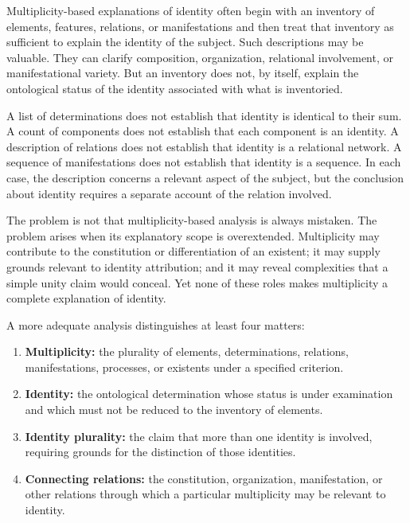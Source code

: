 Multiplicity-based explanations of identity
often begin with an inventory of elements,
features, relations, or manifestations and
then treat that inventory as sufficient to
explain the identity of the subject. Such
descriptions may be valuable. They can
clarify composition, organization, relational
involvement, or manifestational variety.
But an inventory does not, by itself, explain
the ontological status of the identity
associated with what is inventoried.

A list of determinations does not establish
that identity is identical to their sum.
A count of components does not establish
that each component is an identity.
A description of relations does not establish
that identity is a relational network.
A sequence of manifestations does not
establish that identity is a sequence.
In each case, the description concerns
a relevant aspect of the subject, but the
conclusion about identity requires a
separate account of the relation involved.

The problem is not that multiplicity-based
analysis is always mistaken. The problem
arises when its explanatory scope is
overextended. Multiplicity may contribute
to the constitution or differentiation of
an existent; it may supply grounds relevant
to identity attribution; and it may reveal
complexities that a simple unity claim
would conceal. Yet none of these roles
makes multiplicity a complete explanation
of identity.

A more adequate analysis distinguishes
at least four matters:

\begin{enumerate}
    \item \textbf{Multiplicity:} the plurality
    of elements, determinations, relations,
    manifestations, processes, or existents
    under a specified criterion.
    \item \textbf{Identity:} the ontological
    determination whose status is under
    examination and which must not be
    reduced to the inventory of elements.
    \item \textbf{Identity plurality:} the
    claim that more than one identity is
    involved, requiring grounds for the
    distinction of those identities.
    \item \textbf{Connecting relations:} the
    constitution, organization, manifestation,
    or other relations through which a
    particular multiplicity may be relevant
    to identity.
\end{enumerate}

